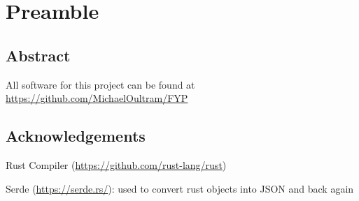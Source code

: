 \chapter{Preamble}
\section{Abstract}

All software for this project can be found at \url{https://github.com/MichaelOultram/FYP}

\section{Acknowledgements}
Rust Compiler (\url{https://github.com/rust-lang/rust})

Serde (\url{https://serde.rs/}): used to convert rust objects into JSON and back again
